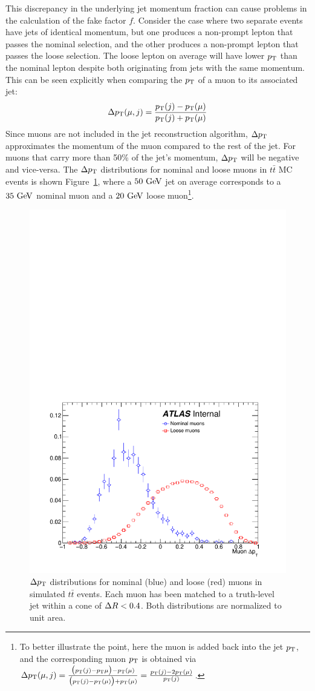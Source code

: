 This discrepancy in the underlying jet momentum fraction can cause problems in the calculation of the fake factor $f$.
Consider the case where two separate events have jets of identical momentum, but one produces a non-prompt lepton that passes the nominal selection, and the other produces a non-prompt lepton that passes the loose selection.
The loose lepton on average will have lower $p_{\mathrm{T}}$ than the nominal lepton despite both originating from jets with the same momentum.
This can be seen explicitly when comparing the $p_{\mathrm{T}}$ of a muon to its associated jet:
\begin{equation}
\Delta\pt(\mu,j) = \frac{\pt(j)-\pt(\mu)}{\pt(j)+\pt(\mu)}
\label{eq:ssww13tev_ff_deltapt}
\end{equation}
Since muons are not included in the jet reconstruction algorithm, $\Delta p_{\mathrm{T}}$ approximates the momentum of the muon compared to the rest of the jet.
For muons that carry more than 50\% of the jet's momentum, $\Delta p_{\mathrm{T}}$ will be negative and vice-versa.
The $\Delta p_{\mathrm{T}}$ distributions for nominal and loose muons in $t\bar{t}$ MC events is shown Figure~\ref{fig:ssww13tev_ff_deltapt}, where a $50\gev$ jet on average corresponds to a $35\gev$ nominal muon and a $20\gev$ loose muon\footnote{To better illustrate the point, here the muon is added back into the jet $p_{\mathrm{T}}$, and the corresponding muon $p_{\mathrm{T}}$ is obtained via $\Delta p_{\mathrm{T}}(\mu,j) = \frac{\big(p_{\mathrm{T}}(j)-p_{\mathrm{T}}{\mu}\big)-p_{\mathrm{T}}(\mu)}{\big(p_{\mathrm{T}}(j)-p_{\mathrm{T}}(\mu)\big)+p_{\mathrm{T}}(\mu)} = \frac{p_{\mathrm{T}}(j)-2p_{\mathrm{T}}(\mu)}{p_{\mathrm{T}}(j)}$.}.

\begin{figure}[htbp]
  \centering
  \includegraphics[width=.6\textwidth]{figs/ssww_13tev/backgrounds/ff/deltapt_ttbar}
  \caption{$\Delta p_{\mathrm{T}}$ distributions for nominal (blue) and loose (red) muons in simulated $t\bar{t}$ events.  Each muon has been matched to a truth-level jet within a cone of $\Delta R < 0.4$.  Both distributions are normalized to unit area.}
  \label{fig:ssww13tev_ff_deltapt}
\end{figure}

